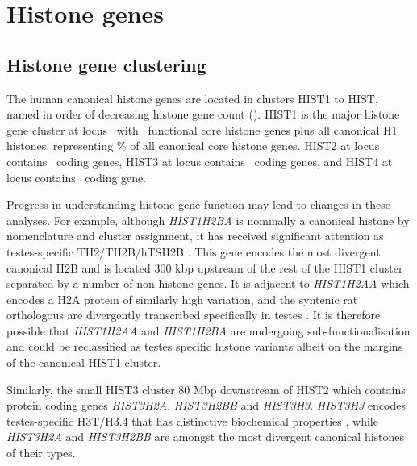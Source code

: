 \section{Histone genes}

  \subsection{Histone gene clustering}
    The human canonical histone genes are located in clusters HIST1 to HIST\NumberOfClusters{},
    named in order of decreasing histone gene count ().
    HIST1 is the major histone gene cluster at locus~\HISTOneLocus{}
    with \CoreCodingGenesInHISTOne{}~functional core histone genes plus all canonical H1 histones,
    representing  \result{}\%
    of all canonical core histone genes.
    HIST2 at locus \HISTTwoLocus{} contains \CoreCodingGenesInHISTTwo{}~coding genes,
    HIST3 at locus \HISTThreeLocus{} contains \CoreCodingGenesInHISTThree{}~coding genes,
    and HIST4 at locus \HISTFourLocus{} contains \CoreCodingGenesInHISTFour{}~coding gene.

    Progress in understanding histone gene function may lead to changes in these analyses.
    For example, although \textit{HIST1H2BA} is nominally a canonical histone
    by nomenclature and cluster assignment,
    it has received significant attention as testes-specific TH2/TH2B/hTSH2B
    \citep{Zalensky2002,LiAusio2005,Shinagawa2014}.
    This gene encodes the most divergent canonical H2B
    and is located 300 kbp upstream of the rest of the HIST1 cluster
    separated by a number of non-histone genes.
    It is adjacent to \textit{HIST1H2AA} which encodes a H2A protein
    of similarly high variation,
    and the syntenic rat orthologous are divergently transcribed
    specifically in testes \citep{HuhChae1991}.
    It is therefore possible that \textit{HIST1H2AA} and \textit{HIST1H2BA}
    are undergoing sub-functionalisation and could be reclassified
    as testes specific histone variants albeit on the margins of the canonical HIST1 cluster.

    \label{sec:hist3h3}
    Similarly, the small HIST3 cluster 80 Mbp downstream of HIST2
    which contains protein coding genes \textit{HIST3H2A}, \textit{HIST3H2BB} and \textit{HIST3H3}.
    \textit{HIST3H3} encodes testes-specific H3T/H3.4
    that has distinctive biochemical properties \citep{WittExpCellRes1996,KurumizakaCOSB2013},
    while \textit{HIST3H2A} and \textit{HIST3H2BB} are amongst
    the most divergent canonical histones of their types.

